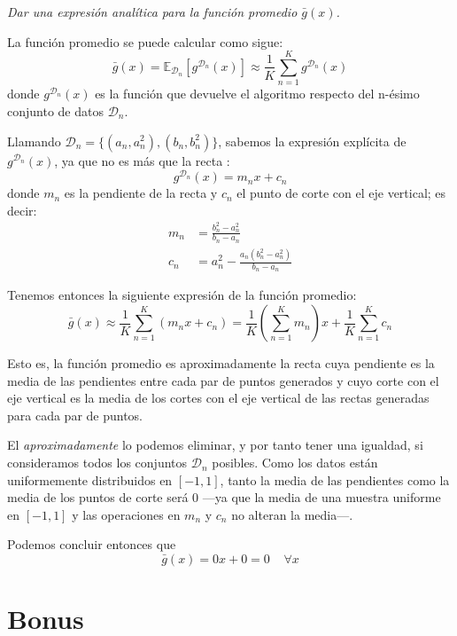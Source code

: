 \documentclass[a4paper, 11pt]{article}
\begin{document}
    \begin{solucion}
        \emph{Dar una expresión analítica para la función promedio $\bar{g}(x)$.}

        La función promedio se puede calcular como sigue:
        \[
        \bar{g}(x) = \mathbb{E}_{\mathcal{D}_n}[g^{\mathcal{D}_n}(x)] \approx \frac{1}{K} \sum_{n=1}^K g^{\mathcal{D}_n}(x)
        \]
        donde $g^{\mathcal{D}_n}(x)$ es la función que devuelve el algoritmo respecto del n-ésimo conjunto de datos $\mathcal{D}_n$.

        Llamando $\mathcal{D}_n =\{(a_n, a_n^2), (b_n, b_n^2)\}$, sabemos la expresión explícita de $g^{\mathcal{D}_n}(x)$, ya que no es más que la recta :
        \[
        g^{\mathcal{D}_n}(x) = m_n x + c_n
        \]
        donde $m_n$ es la pendiente de la recta y $c_n$ el punto de corte con el eje vertical; es decir:
        \begin{align*}
            m_n &= \frac{b_n^2 - a_n^2}{b_n - a_n} \\
            c_n &= a_n^2 - \frac{a_n (b_n^2-a_n^2)}{b_n - a_n}
        \end{align*}

        Tenemos entonces la siguiente expresión de la función promedio:
        \[
        \bar{g}(x) \approx \frac{1}{K} \sum_{n=1}^K (m_n x + c_n) = \frac{1}{K} \left( \sum_{n=1}^K m_n \right) x  +  \frac{1}{K} \sum_{n=1}^K c_n
        \]

        Esto es, la función promedio es aproximadamente la recta cuya pendiente es la media de las pendientes entre cada par de puntos generados y cuyo corte con el eje vertical es la media de los cortes con el eje vertical de las rectas generadas para cada par de puntos.

        El \emph{aproximadamente} lo podemos eliminar, y por tanto tener una igualdad, si consideramos todos los conjuntos $\mathcal{D}_n$ posibles. Como los datos están uniformemente distribuidos en $[-1, 1]$, tanto la media de las pendientes como la media de los puntos de corte será 0 ---ya que la media de una muestra uniforme en $[-1,1]$ y las operaciones en $m_n$ y $c_n$ no alteran la media---.

        Podemos concluir entonces que
        \[
        \bar{g}(x) = 0x + 0 = 0 \;\;\;\; \forall x
        \]
    \end{solucion}


    \section{Bonus}
\end{document}
